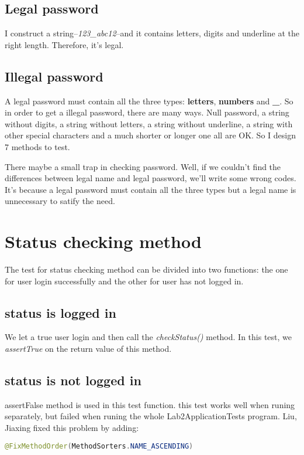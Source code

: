 \documentclass[a4paper]{report}
\begin{document}
\subsection{Legal password}
\par I construct a string--\emph{123\_abc12}--and it contains letters, digits and underline at the right length. Therefore, it's legal.
\subsection{Illegal password}
\par A legal password must contain all the three types: \textbf{letters}, \textbf{numbers} and \textbf{\_}. So in order to get a illegal password, there are many ways. Null password, a string without digits, a string without letters, a string without underline, a string with other special characters and a much shorter or longer one all are OK. So I design 7 methods to test. 
\par There maybe a small trap in checking password. Well, if we couldn't find the differences between legal name and legal password,  we'll write some wrong codes. It's because a legal password must contain all the three types but a legal name is unnecessary to satify the need.
\section{Status checking method}
\par The test for status checking method can be divided into two functions: the one for user login successfully and the other for user has not logged in.
\subsection{status is logged in }
\par We let a true user login and then call the \emph{checkStatus()} method. In this test, we \emph{assertTrue} on the return value of this method.
\subsection{status is not logged in}
\par assertFalse method is used in this test function.
this test works well when runing separately, but failed when runing the whole Lab2ApplicationTests program.
Liu, Jiaxing fixed this problem by adding:
\begin{lstlisting}[language=java]
@FixMethodOrder(MethodSorters.NAME_ASCENDING)
\end{lstlisting}
\end{document}
